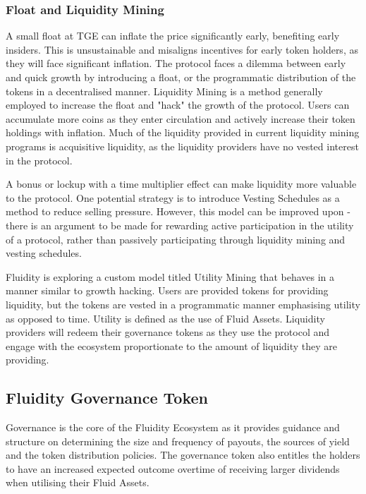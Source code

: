 \subsubsection{Float and Liquidity Mining}
A small float at TGE can inflate the price significantly early, benefiting early insiders. This is unsustainable and misaligns incentives for early token holders, as they will face significant inflation. The protocol faces a dilemma between early and quick growth by introducing a float, or the programmatic distribution of the tokens in a decentralised manner. Liquidity Mining is a method generally employed to increase the float and "hack" the growth of the protocol. Users can accumulate more coins as they enter circulation and actively increase their token holdings with inflation. Much of the liquidity provided in current liquidity mining programs is acquisitive liquidity, as the liquidity providers have no vested interest in the protocol.

 A bonus or lockup with a time multiplier effect can make liquidity more valuable to the protocol. One potential strategy is to introduce Vesting Schedules as a method to reduce selling pressure. However, this model can be improved upon - there is an argument to be made for rewarding active participation in the utility of a protocol, rather than passively participating through liquidity mining and vesting schedules.

Fluidity is exploring a custom model titled Utility Mining that behaves in a manner similar to growth hacking. Users are provided tokens for providing liquidity, but the tokens are vested in a programmatic manner emphasising utility as opposed to time. Utility is defined as the use of Fluid Assets. Liquidity providers will redeem their governance tokens as they use the protocol and engage with the ecosystem proportionate to the amount of liquidity they are providing.

\subsection{Fluidity Governance Token}

Governance is the core of the Fluidity Ecosystem as it provides guidance and structure on determining the size and frequency of payouts, the sources of yield and the token distribution policies. The governance token also entitles the holders to have an increased expected outcome overtime of receiving larger dividends when utilising their Fluid Assets.


